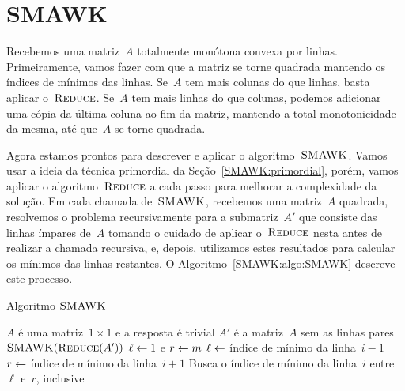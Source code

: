 
\section{SMAWK}
\newcommand{\SMAWK}{\textsc{SMAWK}}

Recebemos uma matriz~$A$ totalmente monótona convexa por linhas. Primeiramente, vamos fazer com que a matriz se torne quadrada mantendo os índices de mínimos das linhas. Se~$A$ tem mais colunas do que linhas, basta aplicar o~$\textsc{Reduce}$. Se~$A$ tem mais linhas do que colunas, podemos adicionar uma cópia da última coluna ao fim da matriz, mantendo a total monotonicidade da mesma, até que~$A$ se torne quadrada.

Agora estamos prontos para descrever e aplicar o algoritmo~$\SMAWK$. Vamos usar a ideia da técnica primordial da Seção~\ref{SMAWK:primordial}, porém, vamos aplicar o algoritmo~$\textsc{Reduce}$ a cada passo para melhorar a complexidade da solução. Em cada chamada de~$\SMAWK$, recebemos uma matriz~$A$ quadrada, resolvemos o problema recursivamente para a submatriz~$A'$ que consiste das linhas ímpares de~$A$ tomando o cuidado de aplicar o~$\textsc{Reduce}$ nesta antes de realizar a chamada recursiva, e, depois, utilizamos estes resultados para calcular os mínimos das linhas restantes. O Algoritmo~\ref{SMAWK:algo:SMAWK} descreve este processo.

\begin{algorithm}[h]
\caption{Algoritmo $\SMAWK$}
\label{SMAWK:algo:SMAWK}
\begin{algorithmic}[1]
\Function{\SMAWK}{A}
        \State $A$ é uma matriz~$1 \times 1$ e a resposta é trivial
    \Else
        \State $A'$ é a matriz~$A$ sem as linhas pares
        \State $\SMAWK(\Reduce(A'))$
            \State $\ell \leftarrow 1$ e $r \leftarrow m$
                \State $\ell \leftarrow$ índice de mínimo da linha~$i - 1$
            \EndIf
                \State $r \leftarrow$ índice de mínimo da linha~$i + 1$
            \EndIf
            \State Busca o índice de mínimo da linha~$i$ entre~$\ell$ e~$r$, inclusive
        \EndFor
    \EndIf
\EndFunction
\end{algorithmic}
\end{algorithm}



